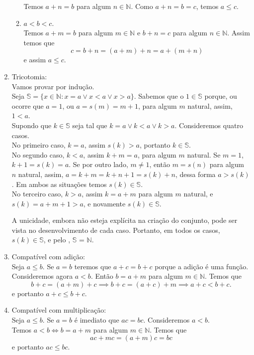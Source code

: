 \documentclass[../main.tex]{subfiles}
\begin{document}
\begin{dem}
\begin{enumerate}[label=(\roman*)]
\begin{enumerate}[label=(\arabic*)]
                    Temos $a+n = b$ para algum $n \in \mathbb{N}$. Como $a+n = b = c$, temos $a \leq c$.
                \item $a < b < c$. \\
                    Temos $a+m = b$ para algum $m \in \mathbb{N}$ e $b+n = c$ para algum $n \in \mathbb{N}$. Assim temos que 
                    \[c = b+n = (a+m)+n = a + (m+n)\]
                    e assim $a \leq c$.
            \end{enumerate}
        \item Tricotomia: \\
        Vamos provar por indução. \\
        Seja $\mathbb{S} = \{ x \in \mathbb{N} : x = a \lor x < a \lor x > a \}$. Sabemos que o $1 \in \mathbb{S}$ porque, ou ocorre que $a = 1$, ou $a = s(m) = m + 1$, para algum $m$ natural, assim, $1 < a$. \\
        Supondo que $k \in \mathbb{S}$ seja tal que $k = a \lor k < a \lor k > a$. Consideremos quatro casos.  \\
        
        No primeiro caso, $k = a$, assim $s(k) > a$, portanto $k \in \mathbb{S}$. \\
        No segundo caso, $k < a$, assim $k + m = a$, para algum $m$ natural. Se $m = 1$, $k+1 = s(k) = a$. Se por outro lado, $m \neq 1$, então $m = s(n)$ para algum $n$ natural, assim, $a = k + m = k + n + 1 = s(k) + n$, dessa forma $a > s(k)$. Em ambos as situações temos $s(k) \in \mathbb{S}$. \\
        No terceiro caso, $k > a$, assim $k = a + m$ para algum $m$ natural, e $s(k) = a + m + 1 > a$, e novamente $s(k) \in \mathbb{S}$.

        A unicidade, embora não esteja explícita na criação do conjunto, pode ser vista no desenvolvimento de cada caso.
        Portanto, em todos os casos, $s(k) \in \mathbb{S}$, e pelo , $\mathbb{S}$ = $\mathbb{N}$.
        
        \item Compatível com adição: \\
        Seja $a \leq b$. Se $a = b$ teremos que $a+c = b+c$ porque a adição é uma função.
        Consideremos agora $a < b$. Então $b = a + m $ para algum $m \in \mathbb{N}$. Temos que
        \[ b+c = (a+m)+c \implies b+c = (a+c)+m \implies a+c < b+c. \]
        e portanto $a+c \leq b+c$.
        \item Compatível com multiplicação: \\
        Seja $a \leq b$. Se $a = b$ é imediato que $ac = bc$.
        Consideremos $a < b$. \\ 
        Temos $a < b \iff b = a + m$ para algum $m \in \mathbb{N}$. Temos que
        \[ ac + mc = (a+m)c = bc \]
        e portanto $ac \leq bc$.
        

\end{enumerate}
\end{dem}
\end{document}
